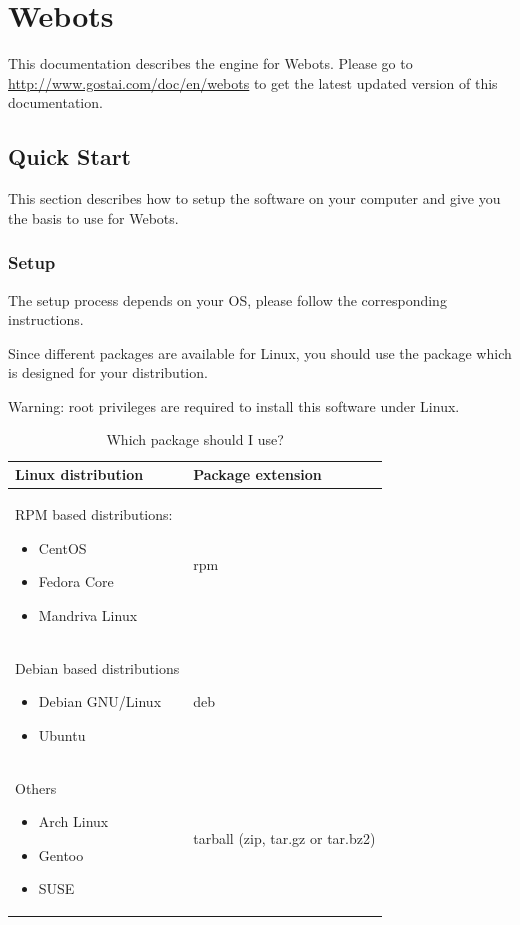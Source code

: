 \chapter{Webots}
\label{sec:webots}


This documentation describes the \urbi engine for Webots.  Please go to
\url{http://www.gostai.com/doc/en/webots} to get the latest updated
version of this documentation.



\section{Quick Start}
\label{webots.quickstart}%

This section describes how to setup the software on your computer and
give you the basis to use \urbi for Webots.


\subsection{Setup}
\label{webots.setup}%

The setup process depends on your OS, please follow the corresponding
instructions.

Since different packages are available for Linux, you should use the
package which is designed for your distribution.

Warning: root privileges are required to install this software under
Linux.

\begin{table}[htbp]
  \begin{center}
    \begin{tabular}{p{.4\linewidth}l}
      \hline
      Linux distribution &    Package extension\\
      \hline
      RPM based distributions:
      \begin{itemize}
      \item CentOS
      \item Fedora Core
      \item Mandriva Linux
      \end{itemize}
      &
      rpm\\
      Debian based distributions
      \begin{itemize}
      \item Debian GNU/Linux
      \item Ubuntu
      \end{itemize}
      &
      deb \\
      Others
      \begin{itemize}
      \item Arch Linux
      \item Gentoo
      \item SUSE
      \end{itemize}
      &
      tarball (zip, tar.gz or tar.bz2)\\
      \hline
    \end{tabular}
  \end{center}
  \caption{Which package should I use?}
  \label{webots.setup.distributions}%
\end{table}

